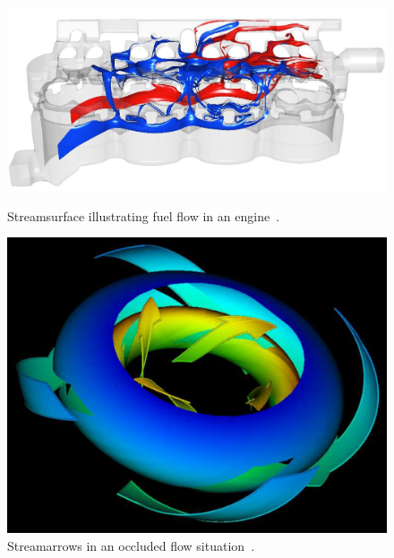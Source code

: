 \begin{figure}
	\centering
	\begin{minipage}[t]{.45\textwidth}
		\centering
		\includegraphics[width=1.05\textwidth]{images/streamSurface}
		\caption{Streamsurface illustrating fuel flow in an engine~\cite{Laramee2005a}.}
		\label{fig:streamSurface}
	\end{minipage}\qquad
	\begin{minipage}[t]{.45\textwidth}
		\centering
		\includegraphics[width=.8\textwidth]{images/streamArrows2}
		\caption{Streamarrows in an occluded flow situation~\cite{Loffelmann1997}.}
		\label{fig:streamArrows2}
	\end{minipage}
\end{figure}

